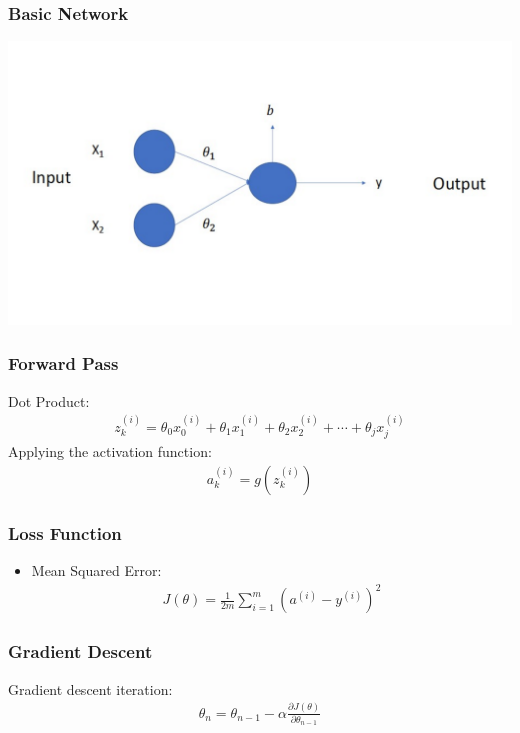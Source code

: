 \documentclass{beamer}
\begin{document}
\begin{frame}
    \frametitle{Basic Network}

    \centerline{\includegraphics[scale = .3]{FIG1.pdf}}

\end{frame}

\begin{frame}
    \frametitle{Forward Pass}
    Dot Product: 
    \begin{align*}
        z_{k}^{(i)} = \theta_{0} x_0^{(i)} + \theta_{1}x_1^{(i)} + \theta_{2}x_2^{(i)} + \cdots + \theta_{j}x_j^{(i)}
    \end{align*}
    Applying the activation function: 
    \begin{align*}
        a_{k}^{(i)} = g(z_k^{(i)})
    \end{align*}
    
\end{frame}

\begin{frame}
    \frametitle{Loss Function}
    \begin{itemize}[<+->]
        \item Mean Squared Error: 
        \begin{align*}
            J(\theta) = \frac{1}{2m}\sum_{i = 1}^m (a^{(i)} - y^{(i)})^2
        \end{align*}
    \end{itemize}
    
\end{frame}

\begin{frame}
    \frametitle{Gradient Descent}
    Gradient descent iteration: 
    \begin{align*}
        \theta_{n} = \theta_{n-1} - \alpha \frac{\partial J(\theta)}{\partial \theta_{n-1}}
    \end{align*}
    
\end{frame}
\end{document}
